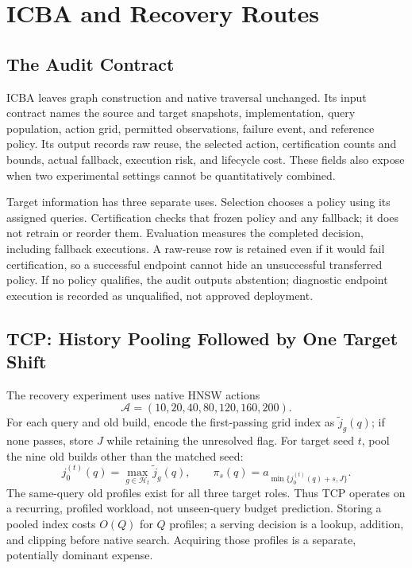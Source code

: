\section{ICBA and Recovery Routes}
\label{sec:auditor}

\subsection{The Audit Contract}
ICBA leaves graph construction and native traversal unchanged. Its input contract names the source and target snapshots, implementation, query population, action grid, permitted observations, failure event, and reference policy. Its output records raw reuse, the selected action, certification counts and bounds, actual fallback, execution risk, and lifecycle cost. These fields also expose when two experimental settings cannot be quantitatively combined.

Target information has three separate uses. Selection chooses a policy using its assigned queries. Certification checks that frozen policy and any fallback; it does not retrain or reorder them. Evaluation measures the completed decision, including fallback executions. A raw-reuse row is retained even if it would fail certification, so a successful endpoint cannot hide an unsuccessful transferred policy. If no policy qualifies, the audit outputs abstention; diagnostic endpoint execution is recorded as unqualified, not approved deployment.

\subsection{TCP: History Pooling Followed by One Target Shift}
\label{sec:tcp-implementation}
The recovery experiment uses native HNSW actions
\begin{equation}
 \mathcal A=(10,20,40,80,120,160,200).\label{eq:tcp-grid}
\end{equation}
For each query and old build, encode the first-passing grid index as $\tilde j_g(q)$; if none passes, store $J$ while retaining the unresolved flag. For target seed $t$, pool the nine old builds other than the matched seed:
\begin{equation}
 j_0^{(t)}(q)=\max_{g\in\mathcal H_t}\tilde j_g(q),\qquad
 \pi_s(q)=a_{\min\{j_0^{(t)}(q)+s,J\}}.\label{eq:shift}
\end{equation}
The same-query old profiles exist for all three target roles. Thus TCP operates on a recurring, profiled workload, not unseen-query budget prediction. Storing a pooled index costs $O(Q)$ for $Q$ profiles; a serving decision is a lookup, addition, and clipping before native search. Acquiring those profiles is a separate, potentially dominant expense.

